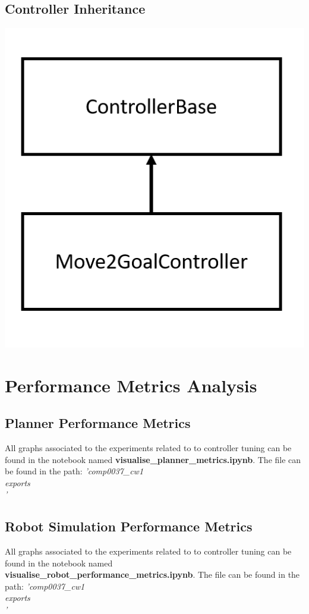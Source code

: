 \documentclass[a4paper,12pt]{article}
\begin{document}
	\subsection{Controller Inheritance}
	\label{appendix:controller}
	\includegraphics[scale=0.6]{images/controller_inheritance.png}
	\section{Performance Metrics Analysis}
	\label{appendix:metrics}
	\subsection{Planner Performance Metrics}
	All graphs associated to the experiments related to to controller tuning can be found in the notebook named \textbf{visualise\_planner\_metrics.ipynb}. The file can be found in the path: \textit{'comp0037\_cw1\\exports\\'}
	\subsection{Robot Simulation Performance Metrics}
	All graphs associated to the experiments related to to controller tuning can be found in the notebook named \textbf{visualise\_robot\_performance\_metrics.ipynb}. The file can be found in the path: \textit{'comp0037\_cw1\\exports\\'}
\end{document}
